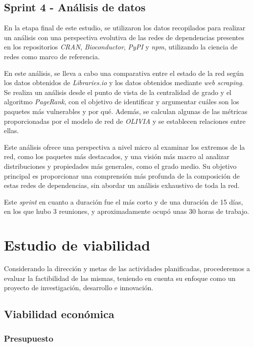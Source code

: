 \subsection{Sprint 4 - Análisis de datos}

En la etapa final de este estudio, se utilizaron los datos recopilados para realizar un análisis con una perspectiva 
evolutiva de las redes de dependencias presentes en los repositorios \textit{CRAN}, \textit{Bioconductor}, \textit{PyPI} 
y \textit{npm}, utilizando la ciencia de redes como marco de referencia.

En este análisis, se lleva a cabo una comparativa entre el estado de la red según los datos obtenidos de \textit{Libraries.io} 
y los datos obtenidos mediante \textit{web scraping}. Se realiza un análisis desde el punto de vista de la centralidad de 
grado y el algoritmo \textit{PageRank}, con el objetivo de identificar y argumentar cuáles son los paquetes más vulnerables 
y por qué. Además, se calculan algunas de las métricas proporcionadas por el modelo de red de \textit{OLIVIA} y se establecen 
relaciones entre ellas.

Este análisis ofrece una perspectiva a nivel micro al examinar los extremos de la red, como los paquetes más destacados, y 
una visión más macro al analizar distribuciones y propiedades más generales, como el grado medio. Su objetivo principal es 
proporcionar una comprensión más profunda de la composición de estas redes de dependencias, sin abordar un análisis exhaustivo 
de toda la red.

Este \textit{sprint} en cuanto a duración fue el más corto y de una duración de 15 días, en los que hubo 3 reuniones, y 
aproximadamente ocupó unas 30 horas de trabajo.


\section{Estudio de viabilidad}

Considerando la dirección y metas de las actividades planificadas, procederemos a evaluar la factibilidad de las mismas, 
teniendo en cuenta su enfoque como un proyecto de investigación, desarrollo e innovación.

\subsection{Viabilidad económica}

\subsubsection{Presupuesto}

